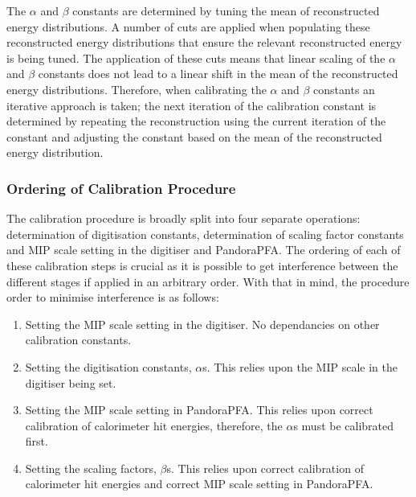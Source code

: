 The $\alpha$ and $\beta$ constants are determined by tuning the mean of reconstructed energy distributions.  A number of cuts are applied when populating these reconstructed energy distributions that ensure the relevant reconstructed energy is being tuned.  The application of these cuts means that linear scaling of the $\alpha$ and $\beta$ constants does not lead to a linear shift in the mean of the reconstructed energy distributions.  Therefore, when calibrating the $\alpha$ and $\beta$ constants an iterative approach is taken; the next iteration of the calibration constant is determined by repeating the reconstruction using the current iteration of the constant and adjusting the constant based on the mean of the reconstructed energy distribution.  


\subsubsection{Ordering of Calibration Procedure}
\label{sec:ordercalibration}
The calibration procedure is broadly split into four separate operations: determination of digitisation constants, determination of scaling factor constants and  MIP scale setting in the digitiser and PandoraPFA.  The ordering of each of these calibration steps is crucial as it is possible to get interference between the different stages if applied in an arbitrary order.  With that in mind, the procedure order to minimise interference is as follows:

\begin{enumerate} 
\item Setting the MIP scale setting in the digitiser.  No dependancies on other calibration constants.  
\item Setting the digitisation constants, $\alpha$s.  This relies upon the MIP scale in the digitiser being set.
\item Setting the MIP scale setting in PandoraPFA.  This relies upon correct calibration of calorimeter hit energies, therefore, the $\alpha$s must be calibrated first.
\item Setting the scaling factors, $\beta$s.  This relies upon correct calibration of calorimeter hit energies and correct MIP scale setting in PandoraPFA.
\end{enumerate} 


